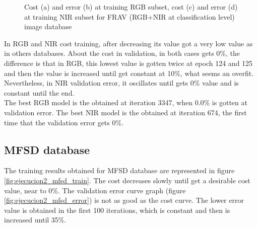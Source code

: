 \begin{figure}[htb]
\caption{Cost (a) and error (b) at training RGB subset, cost (c) and error (d) at training NIR subset for FRAV (RGB+NIR at classification level) image database}
\label{fig:ejecucion2_frav_clas_train}
\end{figure}

In RGB and NIR cost training, after decreasing its value got a very low value as in others databases. About the cost in validation, in both cases gets 0\%, the difference is that in RGB, this lowest value is gotten twice at epoch 124 and 125 and then the value is increased until get constant at 10\%, what seems an overfit. Nevertheless, in NIR validation error, it oscillates until gets 0\% value and is constant until the end.\\

The best RGB model is the obtained at iteration 3347, when 0.0\% is gotten at validation error. The best NIR model is the obtained at iteration 674, the first time that the validation error gets 0\%.\\

\subsection{MFSD database}
The training results obtained for MFSD database are represented in figure \ref{fig:ejecucion2_mfsd_train}. The cost decreases slowly until get a desirable cost value, near to 0\%. The validation error curve graph (figure \ref{fig:ejecucion2_mfsd_error}) is not as good as the cost curve. The lower error value is obtained in the first 100 iterations, which is constant and then is increased until 35\%.\\

